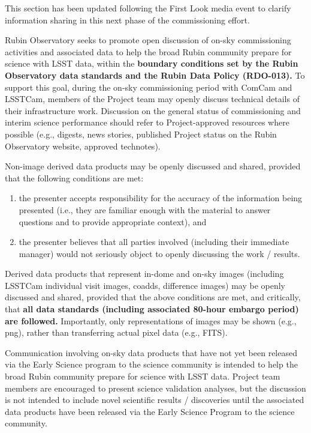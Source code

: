 \documentclass[SE,authoryear,toc]{lsstdoc}
\begin{document}
\begin{note}
This section has been updated following the First Look media event to clarify information sharing in this next phase of the commissioning effort.
\end{note}

Rubin Observatory seeks to promote open discussion of on-sky commissioning activities and associated data to help the broad Rubin community prepare for science with LSST data, within the \textbf{boundary conditions set by the Rubin Observatory data standards and the Rubin Data Policy (RDO-013).}
To support this goal, during the on-sky commissioning period with ComCam and LSSTCam, members of the Project team may openly discuss technical details of their infrastructure work.
Discussion on the general status of commissioning and interim science performance should refer to Project-approved resources where possible (e.g., digests, news stories, published Project status on the Rubin Observatory website, approved technotes).


Non-image derived data products may be openly discussed and shared, provided that the following conditions are met:

\begin{enumerate}

\item the presenter accepts responsibility for the accuracy of the information being presented (i.e., they are familiar enough with the material to answer questions and to provide appropriate context), and

\item the presenter believes that all parties involved (including their immediate manager) would not seriously object to openly discussing the work / results.

\end{enumerate}

Derived data products that represent in-dome and on-sky images (including LSSTCam individual visit images, coadds, difference images) may be openly discussed and shared, provided that the above conditions are met, and critically, that \textbf{all data standards (including associated 80-hour embargo period) are followed.}
Importantly, only representations of images may be shown (e.g., png), rather than transferring actual pixel data (e.g., FITS).

Communication involving on-sky data products that have not yet been released via the Early Science program to the science community is intended to help the broad Rubin community prepare for science with LSST data.
Project team members are encouraged to present science validation analyses, but the discussion is not intended to include novel scientific results / discoveries until the associated data products have been released via the Early Science Program to the science community.
\end{document}
